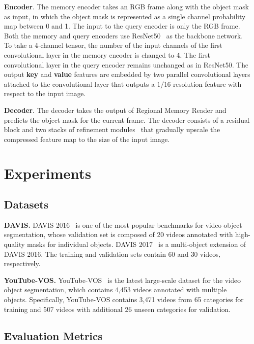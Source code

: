 \documentclass[final]{cvpr}
\begin{document}
\noindent \textbf{Encoder}.
The memory encoder takes an RGB frame along with the object mask as input, in which the object mask is represented as a single channel probability map between 0 and 1.
The input to the query encoder is only the RGB frame.
Both the memory and query encoders use ResNet50~\cite{DBLP:conf/cvpr/HeZRS16} as the backbone network.
To take a 4-channel tensor, the number of the input channels of the first convolutional layer in the memory encoder is changed to 4.
The first convolutional layer in the query encoder remains unchanged as in ResNet50.
The output \textbf{key} and \textbf{value} features are embedded by two parallel convolutional layers attached to the convolutional layer that outputs a $1/16$ resolution feature with respect to the input image.

\noindent \textbf{Decoder}.
The decoder takes the output of Regional Memory Reader and predicts the object mask for the current frame.
The decoder consists of a residual block and two stacks of refinement modules~\cite{DBLP:conf/iccv/OhLXK19} that gradually upscale the compressed feature map to the size of the input image.

\section{Experiments}

\subsection{Datasets}

\noindent \textbf{DAVIS.}
DAVIS 2016~\cite{DBLP:conf/cvpr/PerazziPMGGS16} is one of the most popular benchmarks for video object segmentation, whose validation set is composed of 20 videos annotated with high-quality masks for individual objects.
DAVIS 2017~\cite{DBLP:preprint/arxiv/1704-00675} is a multi-object extension of DAVIS 2016.
The training and validation sets contain 60 and 30 videos, respectively.

\noindent \textbf{YouTube-VOS.}
YouTube-VOS~\cite{DBLP:conf/eccv/XuYFYYLPCH18} is the latest large-scale dataset for the video object segmentation, which contains 4,453 videos annotated with multiple objects.
Specifically, YouTube-VOS contains 3,471 videos from 65 categories for training and 507 videos with additional 26 unseen categories for validation.

\subsection{Evaluation Metrics}
\end{document}
